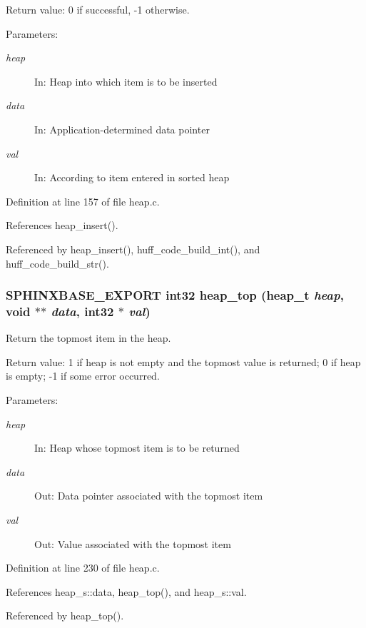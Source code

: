 Return value: 0 if successful, -1 otherwise. \begin{Desc}
\item[Parameters: ]\par
\begin{description}
\item[{\em 
heap}]In: Heap into which item is to be inserted \item[{\em 
data}]In: Application-determined data pointer \item[{\em 
val}]In: According to item entered in sorted heap \end{description}
\end{Desc}


Definition at line 157 of file heap.c.

References heap\_\-insert().

Referenced by heap\_\-insert(), huff\_\-code\_\-build\_\-int(), and huff\_\-code\_\-build\_\-str().
\subsubsection[{heap\_\-top}]{\setlength{\rightskip}{0pt plus 5cm}SPHINXBASE\_\-EXPORT int32 heap\_\-top (heap\_\-t {\em heap}, \/  void $\ast$$\ast$ {\em data}, \/  int32 $\ast$ {\em val})}\label{heap_8h_06cc985d3d5a4c275179fd47ede7316d}


Return the topmost item in the heap. 

Return value: 1 if heap is not empty and the topmost value is returned; 0 if heap is empty; -1 if some error occurred. \begin{Desc}
\item[Parameters: ]\par
\begin{description}
\item[{\em 
heap}]In: Heap whose topmost item is to be returned \item[{\em 
data}]Out: Data pointer associated with the topmost item \item[{\em 
val}]Out: Value associated with the topmost item \end{description}
\end{Desc}


Definition at line 230 of file heap.c.

References heap\_\-s::data, heap\_\-top(), and heap\_\-s::val.

Referenced by heap\_\-top().
